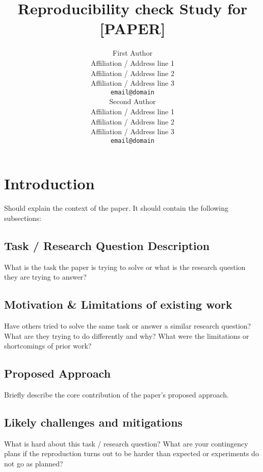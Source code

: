 \documentclass[11pt,a4paper]{article}
\title{Reproducibility check Study for [PAPER]}
\author{First Author \\
  Affiliation / Address line 1 \\
  Affiliation / Address line 2 \\
  Affiliation / Address line 3 \\
  \texttt{email@domain} \\\And
  Second Author \\
  Affiliation / Address line 1 \\
  Affiliation / Address line 2 \\
  Affiliation / Address line 3 \\
  \texttt{email@domain} \\}
\date{}
\begin{document}
\maketitle

\section{Introduction}

Should explain the context of the paper. It should contain the following subsections:

            \subsection{Task / Research Question Description} What is the task the paper is trying to solve or what is the research question they are trying to answer?
            \subsection{Motivation \& Limitations of existing work} 
            Have others tried to solve the same task or answer a similar research question? What are they trying to do differently and why? What were the limitations or shortcomings of prior work? 
            \subsection{Proposed Approach} 
            Briefly describe the core contribution of the paper's proposed approach.
            \subsection{Likely challenges and mitigations} 
            What is hard about this task / research question? What are your contingency plans if the reproduction turns out to be harder than expected or experiments do not go as planned? 
\end{document}
